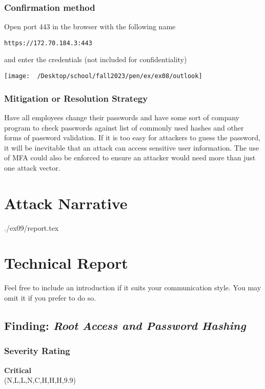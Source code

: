   	\subsubsection*{Confirmation method}
  	    Open port 443 in the browser with the following name
\begin{verbatim}
https://172.70.184.3:443
\end{verbatim}

    and enter the credentials (not included for confidentiality)

\texttt{[image: ~/Desktop/school/fall2023/pen/ex/ex08/outlook]}
				
    \subsubsection*{Mitigation or Resolution Strategy}
        Have all employees change their passwords and have some sort of company program to check passwords against list of commonly used hashes and other forms of password validation.
        If it is too easy for attackers to guess the password, it will be inevitable that an attack can access sensitive user information. The use of MFA could also be enforced
        to ensure an attacker would need more than just one attack vector.



\section{Attack Narrative}
./ex09/report.tex

\section{Technical Report}

Feel free to include an introduction if it suits your communication style.
You may omit it if you prefer to do so.


  \subsection{Finding: \emph{Root Access and Password Hashing}}
	\subsubsection*{Severity Rating}
        \textbf{Critical} \\
		\cvss(N,L,L,N,C,H,H,H,9.9)
		
